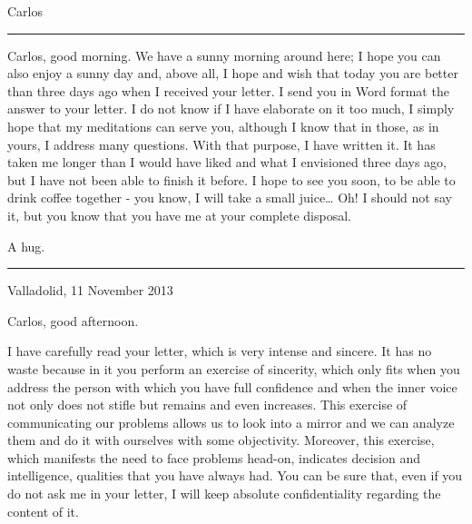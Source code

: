 \documentclass[]{book}
\begin{document}
Carlos

\begin{center}\rule{0.5\linewidth}{\linethickness}\end{center}

Carlos, good morning. We have a sunny morning around here; I hope you can also enjoy a sunny day and, above all, I hope and wish that today you are better than three days ago when I received your letter. I send you in Word format the answer to your letter. I do not know if I have elaborate on it too much, I simply hope that my meditations can serve you, although I know that in those, as in yours, I address many questions. With that purpose, I have written it. It has taken me longer than I would have liked and what I envisioned three days ago, but I have not been able to finish it before. I hope to see you soon, to be able to drink coffee together - you know, I will take a small juice\ldots{} Oh! I should not say it, but you know that you have me at your complete disposal.

A hug.

\begin{center}\rule{0.5\linewidth}{\linethickness}\end{center}

Valladolid, 11 November 2013

Carlos, good afternoon.

I have carefully read your letter, which is very intense and sincere. It has no waste because in it you perform an exercise of sincerity, which only fits when you address the person with which you have full confidence and when the inner voice not only does not stifle but remains and even increases. This exercise of communicating our problems allows us to look into a mirror and we can analyze them and do it with ourselves with some objectivity. Moreover, this exercise, which manifests the need to face problems head-on, indicates decision and intelligence, qualities that you have always had. You can be sure that, even if you do not ask me in your letter, I will keep absolute confidentiality regarding the content of it.
\end{document}
